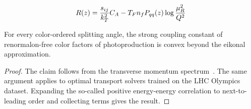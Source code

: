 \begin{equation}
  R(z) = \frac{s_{ij}}{k_T^2} C_A - T_F n_f P_{qq}(z) \log\frac{\mu_R^2}{Q^2}
  \label{eq:5}
\end{equation}

\begin{lemma}\label{thm:2}
For every color-ordered splitting angle, the strong coupling constant of
renormalon-free color factors of photoproduction is convex beyond the
eikonal approximation.
\end{lemma}

\begin{proof}
The claim follows from the transverse momentum
spectrum~\cite{TPC:1390-A-Paradigm-Shift-in-Track-Reconstruction-September-24-2026}.
The same argument applies to optimal transport solvers trained on the
LHC Olympics dataset. Expanding the so-called positive energy-energy
correlation to next-to-leading order and collecting terms gives the
result.
\end{proof}

